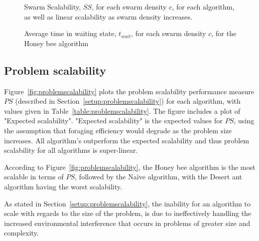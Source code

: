\begin{figure}[!htb]
\centering
\small
\resizebox{\textwidth}{!}{}
\caption{Swarm Scalability, $SS$, for each swarm density $c$, for each algorithm, as well as linear scalability as swarm density increases.}
\label{fig:swarmscalability}
\end{figure}

\begin{figure}[!htb]
\centering
\small
\resizebox{\textwidth}{!}{}
\caption{Average time in waiting state, $t_{wait}$, for each swarm density $c$, for the Honey bee algorithm}
\label{fig:swarmscalabilitywaitingtime}
\end{figure}


\subsection{Problem scalability}
\label{results:problemscalability}

Figure~\ref{fig:problemscalability} plots the problem scalability performance measure $PS$ (described in Section~\ref{setup:problemscalability}) for each algorithm, with values given in Table~\ref{table:problemscalability}. The figure includes a plot of "Expected scalability". "Expected scalability" is the expected values for $PS$, using the assumption that foraging efficiency would degrade as the problem size increases. All algorithm's outperform the expected scalability and thus problem scalability for all algorithms is super-linear.

According to Figure~\ref{fig:problemscalability}, the Honey bee algorithm is the most scalable in terms of $PS$, followed by the Na\"ive algorithm, with the Desert ant algorithm having the worst scalability. %

As stated in Section~\ref{setup:problemscalability}, the inability for an algorithm to scale with regards to the size of the problem, is due to ineffectively handling the increased environmental interference that occurs in problems of greater size and complexity.

